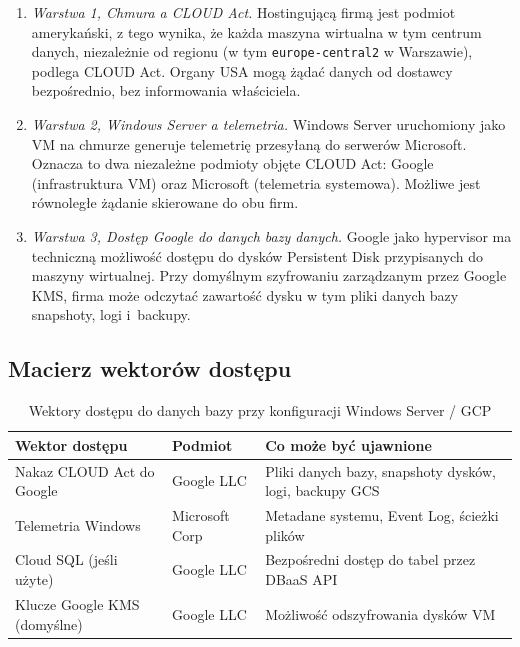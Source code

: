 \begin{enumerate}[label=(\roman*)]
  \item \textit{Warstwa 1, Chmura a CLOUD Act.}
  Hostingującą firmą jest podmiot amerykański, z tego wynika, że każda maszyna wirtualna w tym centrum danych,
  niezależnie od regionu (w tym \texttt{europe-central2} w Warszawie), 
  podlega CLOUD Act. Organy USA mogą żądać danych od dostawcy bezpośrednio,
  bez informowania właściciela.

  \item \textit{Warstwa 2, Windows Server a telemetria.}
  Windows Server uruchomiony jako VM na chmurze generuje telemetrię przesyłaną
  do serwerów Microsoft. Oznacza to {dwa niezależne podmioty
  objęte CLOUD Act}: Google (infrastruktura VM) oraz Microsoft (telemetria
  systemowa). Możliwe jest równoległe żądanie skierowane do obu firm.

  \item \textit{Warstwa 3, Dostęp Google do danych bazy danych.}
  Google jako hypervisor ma techniczną możliwość dostępu do dysków
  Persistent Disk przypisanych do maszyny wirtualnej. Przy domyślnym
  szyfrowaniu zarządzanym przez Google KMS, firma może odczytać zawartość
  dysku w tym pliki danych bazy snapshoty, logi i~backupy.
\end{enumerate}

\subsection{Macierz wektorów dostępu}

\begin{table}[h!]
\centering
\caption{Wektory dostępu do danych bazy przy konfiguracji Windows Server / GCP}
\label{tab:vectors}
\renewcommand{\arraystretch}{1.4}
\begin{tabular}{>{\raggedright}p{4.5cm} >{\raggedright}p{2.5cm}
>{\raggedright\arraybackslash}p{5.5cm}}
\toprule
\textbf{Wektor dostępu} & \textbf{Podmiot} & \textbf{Co może być ujawnione} \\
\midrule
Nakaz CLOUD Act do Google & Google LLC & Pliki danych bazy, snapshoty
dysków, logi, backupy GCS \\
Telemetria Windows & Microsoft Corp & Metadane systemu, Event Log,
ścieżki plików \\
Cloud SQL (jeśli użyte) & Google LLC & Bezpośredni dostęp do tabel
przez DBaaS API \\
Klucze Google KMS (domyślne) & Google LLC & Możliwość odszyfrowania
dysków VM \\
\bottomrule
\end{tabular}
\end{table}

